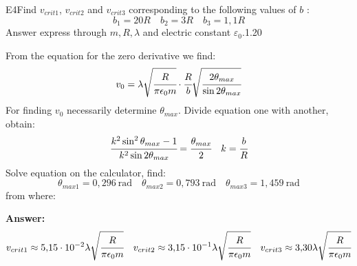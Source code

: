 \documentclass[11pt,a4paper]{article}
\begin{document}
\begin{solcard}{E4}{Find $v_{crit1}$, $v_{crit2}$ and $v_{crit3}$ corresponding to the following values of $b$ : $$b_1=20R\quad b_2=3R\quad b_3=1{,}1R $$ Answer express through $m, R, \lambda$ and electric constant $\varepsilon_0$.}{1.20}

From the equation for the zero derivative we find: $$v_0=\lambda\sqrt{\cfrac{R}{\pi\epsilon_0m}}\cdot{\cfrac{R}{b}\sqrt{\cfrac{2\theta_{max}}{\sin2\theta_{max}}}} $$ For finding $v_0$ necessarily determine $\theta_{max}$. Divide equation one with another, obtain: $$\cfrac{k^2\sin^2\theta_{max}-1}{k^2\sin2\theta_{max}}=\cfrac{\theta_{max}}{2}\quad k=\cfrac{b}{R} $$ Solve equation on the calculator, find: $$\theta_{max1}=0{,}296~\text{rad}\quad\theta_{max2}=0{,}793~\text{rad}\quad\theta_{max3}=1{,}459~\text{rad} $$ from where:

\par\smallskip\noindent\textbf{Answer:} $$v_{crit1}\approx{5{,}15\cdot{10^{-2}}\lambda\sqrt{\cfrac{R}{\pi\epsilon_0m}}}\quad v_{crit2}\approx{3{,}15\cdot{10^{-1}}\lambda\sqrt{\cfrac{R}{\pi\epsilon_0m}}}\quad v_{crit3}\approx{3{,}30\lambda\sqrt{\cfrac{R}{\pi\epsilon_0m}}} $$
\end{solcard}
\end{document}
